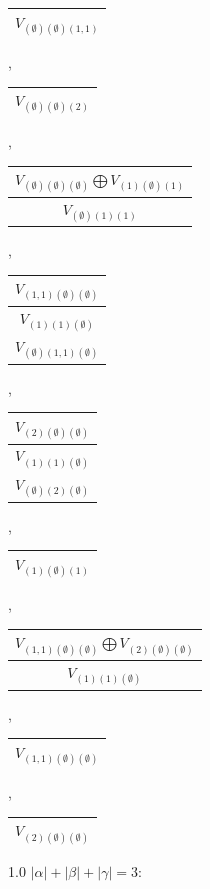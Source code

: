 \documentclass[letterpaper,11pt]{article}
\begin{document}
	\begin{tabular}{| c |}
		\hline
		$V_{(\emptyset)(\emptyset)(1,1)}$\\
		\hline
	\end{tabular}, 
	\begin{tabular}{| c |}
		\hline
		$V_{(\emptyset)(\emptyset)(2)}$\\
		\hline
	\end{tabular}, 
	\begin{tabular}{| c |}
		\hline
		$V_{(\emptyset)(\emptyset)(\emptyset)}$$\bigoplus$$V_{(1)(\emptyset)(1)}$\\
		\hline
		$V_{(\emptyset)(1)(1)}$\\
		\hline
	\end{tabular}, 
	\begin{tabular}{| c |}
		\hline
		$V_{(1,1)(\emptyset)(\emptyset)}$\\
		\hline
		$V_{(1)(1)(\emptyset)}$\\
		\hline
		$V_{(\emptyset)(1,1)(\emptyset)}$\\
		\hline
	\end{tabular}, 
	\begin{tabular}{| c |}
		\hline
		$V_{(2)(\emptyset)(\emptyset)}$\\
		\hline
		$V_{(1)(1)(\emptyset)}$\\
		\hline
		$V_{(\emptyset)(2)(\emptyset)}$\\
		\hline
	\end{tabular}, 
	\begin{tabular}{| c |}
		\hline
		$V_{(1)(\emptyset)(1)}$\\
		\hline
	\end{tabular}, 
	\begin{tabular}{| c |}
		\hline
		$V_{(1,1)(\emptyset)(\emptyset)}$$\bigoplus$$V_{(2)(\emptyset)(\emptyset)}$\\
		\hline
		$V_{(1)(1)(\emptyset)}$\\
		\hline
	\end{tabular}, 
	\begin{tabular}{| c |}
		\hline
		$V_{(1,1)(\emptyset)(\emptyset)}$\\
		\hline
	\end{tabular}, 
	\begin{tabular}{| c |}
		\hline
		$V_{(2)(\emptyset)(\emptyset)}$\\
		\hline
	\end{tabular}
	\newline

	\begin{spacing}{1.0}
		$|\alpha| + |\beta| + |\gamma|=3$:
	\end{spacing}
\end{document}
